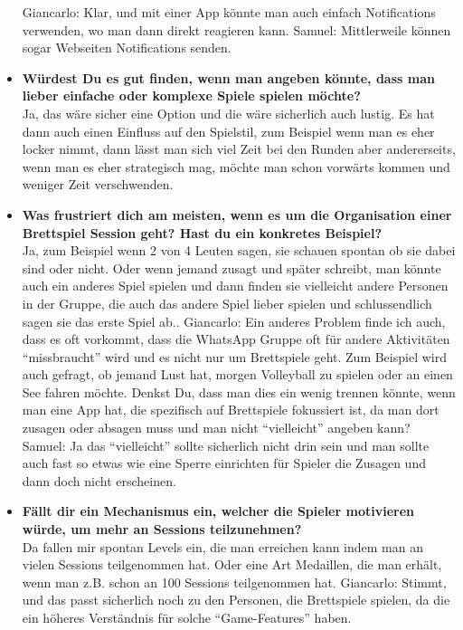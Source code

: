 \begin{appendix}
\begin{itemize}
    Giancarlo: Klar, und mit einer App könnte man auch einfach Notifications verwenden, wo man dann direkt reagieren kann.
    \newline
    Samuel: Mittlerweile können sogar Webseiten Notifications senden.
    \item \textbf{Würdest Du es gut finden, wenn man angeben könnte, dass man lieber einfache oder komplexe Spiele spielen möchte?}\\
    Ja, das wäre sicher eine Option und die wäre sicherlich auch lustig. Es hat dann auch einen Einfluss auf den Spielstil, zum Beispiel wenn man es eher locker nimmt, dann lässt man sich viel Zeit bei den Runden aber andererseits, wenn man es eher strategisch mag, möchte man schon vorwärts kommen und weniger Zeit verschwenden.
    \item \textbf{Was frustriert dich am meisten, wenn es um die Organisation einer Brettspiel Session geht? Hast du ein konkretes Beispiel?}\\
    Ja, zum Beispiel wenn 2 von 4 Leuten sagen, sie schauen spontan ob sie dabei sind oder nicht. Oder wenn jemand zusagt und später schreibt, man könnte auch ein anderes Spiel spielen und dann finden sie vielleicht andere Personen in der Gruppe, die auch das andere Spiel lieber spielen und schlussendlich sagen sie das erste Spiel ab..
    \newline
    Giancarlo: Ein anderes Problem finde ich auch, dass es oft vorkommt, dass die WhatsApp Gruppe oft für andere Aktivitäten “missbraucht” wird und es nicht nur um Brettspiele geht. Zum Beispiel wird auch gefragt, ob jemand Lust hat, morgen Volleyball zu spielen oder an einen See fahren möchte. Denkst Du, dass man dies ein wenig trennen könnte, wenn man eine App hat, die spezifisch auf Brettspiele fokussiert ist, da man dort zusagen oder absagen muss und man nicht “vielleicht” angeben kann?
    \newline
    Samuel: Ja das “vielleicht” sollte sicherlich nicht drin sein und man sollte auch fast so etwas wie eine Sperre einrichten für Spieler die Zusagen und dann doch nicht erscheinen.
    \item \textbf{Fällt dir ein Mechanismus ein, welcher die Spieler motivieren würde, um mehr an Sessions teilzunehmen?}\\
    Da fallen mir spontan Levels ein, die man erreichen kann indem man an vielen Sessions teilgenommen hat. Oder eine Art Medaillen, die man erhält, wenn man z.B. schon an 100 Sessions teilgenommen hat.
    \newline
    Giancarlo: Stimmt, und das passt sicherlich noch zu den Personen, die Brettspiele spielen, da die ein höheres Verständnis für solche “Game-Features” haben.

\end{itemize}
\end{appendix}
